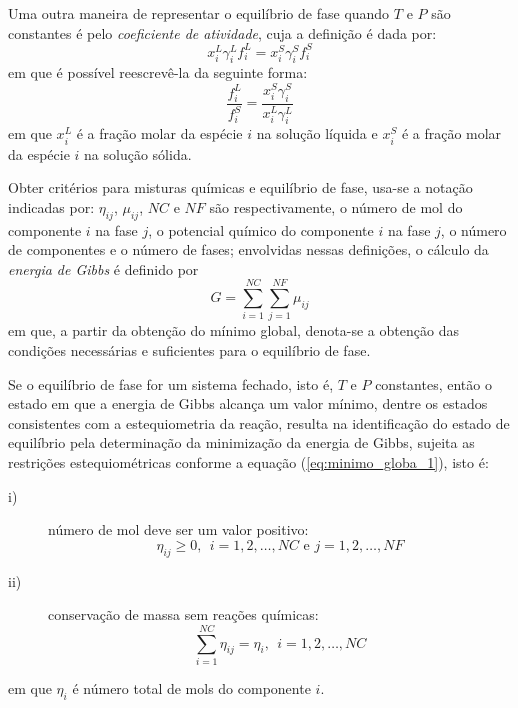 Uma outra maneira de representar o equilíbrio de fase quando $T$ e $P$ são constantes é pelo \textit{coeficiente de atividade}, cuja a definição é dada por:
	\begin{equation}\label{eq:coe_atividade}
	x_{i}^{L}\gamma_{i}^{L}f_{i}^{L}=x_{i}^{S}\gamma_{i}^{S}f_{i}^{S}
	\end{equation}
	em que é possível reescrevê-la da seguinte forma:
	\begin{equation}\label{eq:coe_atividade1}
	\dfrac{f_{i}^{L}}{f_{i}^{S}}=\dfrac{x_{i}^{S}\gamma_{i}^{S}}{x_{i}^{L}\gamma_{i}^{L}}
	\end{equation}
	em que $x_{i}^{L}$ é a fração molar da espécie $i$ na solução líquida e $x_{i}^{S}$ é a fração molar da espécie $i$ na solução sólida.
	\cite{SMITH2000,Rocha2009a,Prausnitz}
	
Obter critérios para misturas químicas e equilíbrio de fase, usa-se a notação indicadas por: $\eta_{ij}$, $\mu_{ij}$, $NC$ e $NF$ são respectivamente, o número de mol do componente $i$ na fase $j$, o potencial químico do componente $i$ na fase $j$, o número de componentes e o número de fases; envolvidas  nessas definições, o cálculo da \textit{energia de Gibbs} é definido por
	\begin{equation}\label{eq:minimo_globa_1}
	G=\sum_{i=1}^{NC}\sum_{j=1}^{NF}\mu_{ij} 
	\end{equation}
	em que, a partir da obtenção do mínimo global, denota-se a obtenção das condições necessárias e suficientes para o equilíbrio de fase.
	
Se o equilíbrio de fase for um sistema fechado, isto é,  $T$ e $P$ constantes, então o estado em que a energia de Gibbs alcança um valor mínimo, dentre os estados consistentes com a estequiometria da reação, resulta na identificação do estado de equilíbrio pela determinação da minimização da energia de Gibbs, sujeita as restrições estequiométricas conforme a equação (\ref{eq:minimo_globa_1}), isto é:
	\begin{description}
		\item[i)] número de mol deve ser um valor positivo:
		\begin{equation}
		\eta_{ij}\geqslant 0,\  \ i=1,2,\ldots,NC \mbox{ e } j=1,2,\ldots,NF
		\end{equation}
		\item[ii)] conservação de massa sem reações químicas:
		\begin{equation}
		\sum_{i=1}^{NC}\eta_{ij}=\eta_{i},\  \ i=1,2,\ldots,NC
		\end{equation}
	\end{description}
	em que $\eta_{i}$ é número total de mols do componente $i$.
	\cite{Sandlel,Barbosa2012,Prausnitz}
	
